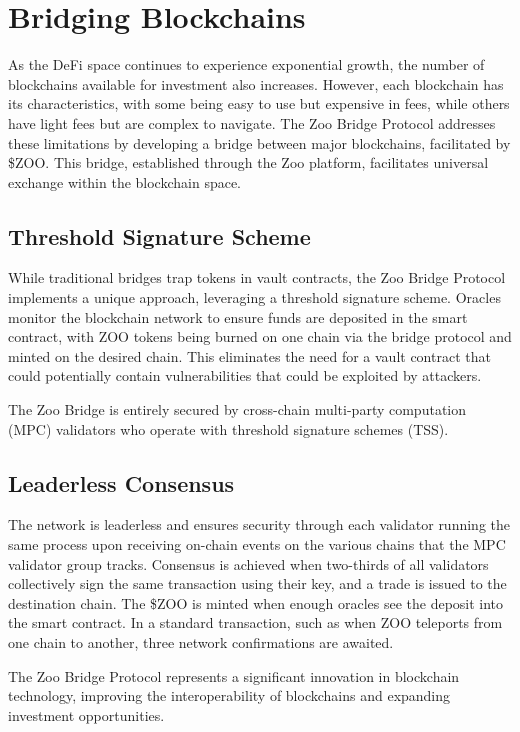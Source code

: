 \section{Bridging Blockchains}

As the DeFi space continues to experience exponential growth, the number of blockchains available for investment also increases. However, each blockchain has its characteristics, with some being easy to use but expensive in fees, while others have light fees but are complex to navigate. The Zoo Bridge Protocol addresses these limitations by developing a bridge between major blockchains, facilitated by \$ZOO. This bridge, established through the Zoo platform, facilitates universal exchange within the blockchain space.

\subsection{Threshold Signature Scheme}

While traditional bridges trap tokens in vault contracts, the Zoo Bridge Protocol implements a unique approach, leveraging a threshold signature scheme. Oracles monitor the blockchain network to ensure funds are deposited in the smart contract, with ZOO tokens being burned on one chain via the bridge protocol and minted on the desired chain. This eliminates the need for a vault contract that could potentially contain vulnerabilities that could be exploited by attackers.

The Zoo Bridge is entirely secured by cross-chain multi-party computation (MPC) validators who operate with threshold signature schemes (TSS).

\subsection{Leaderless Consensus}

The network is leaderless and ensures security through each validator running the same process upon receiving on-chain events on the various chains that the MPC validator group tracks. Consensus is achieved when two-thirds of all validators collectively sign the same transaction using their key, and a trade is issued to the destination chain. The \$ZOO is minted when enough oracles see the deposit into the smart contract. In a standard transaction, such as when ZOO teleports from one chain to another, three network confirmations are awaited.

The Zoo Bridge Protocol represents a significant innovation in blockchain technology, improving the interoperability of blockchains and expanding investment opportunities.
